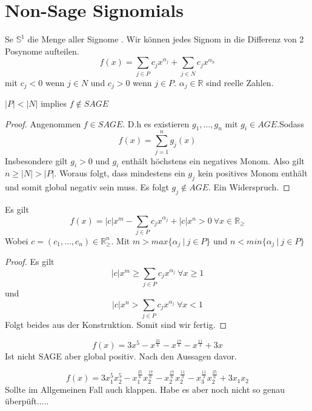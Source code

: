 \documentclass[./main.tex]{subfiles}
\begin{document}
\section{Non-Sage Signomials}
Se $\mathbb{S}^1$ die Menge aller Signome . Wir können jedes Signom in die Differenz von 2 Posynome aufteilen.
\begin{equation}
f(x)= \sum_{j \in P } c_j x^{\alpha_j} + \sum_{j \in N} c_j x^{\alpha_h}
\end{equation}
mit $c_j<0$ wenn $j \in N$ und $c_j>0$ wenn $j \in P$. $\alpha_j \in \mathbb{R}$ sind reelle Zahlen.

\begin{lem}
$\left\vert P \right\vert < \left\vert N \right\vert$ implies $f \not\in SAGE$
\begin{proof}
Angenommen $f \in SAGE$. D.h es existieren $g_1,\dots,g_n$ mit $g_i \in AGE$.Sodass 
\begin{equation}
f(x)= \sum_{j =1}^n g_j(x)
\end{equation}
Insbesondere gilt $g_i>0$ und $g_i$ enthält höchstens ein negatives Monom. Also gilt $n \geq \left\vert N \right\vert > \left\vert P \right\vert$. Woraus folgt, dass mindestens ein $g_j$ kein positives Monom enthält und somit global negativ sein muss. Es folgt $g_j \not\in  AGE$. Ein Widerspruch.
\end{proof}
\end{lem}

\begin{lem}
Es gilt
\begin{equation}
f(x) = \left\vert c \right\vert x^m - \sum_{j\in P} c_j x^{\alpha_j} + \left\vert c \right\vert x^n >0 \ \forall x\in \mathbb{R_\geq}
\end{equation}
Wobei $ c=(c_1,\dots,c_n) \in \mathbb{R}_\geq^n$. Mit $m > max \lbrace \alpha_j \ \vert \  j \in P \rbrace$ und $n < min \lbrace \alpha_j \ \vert \  j \in P \rbrace$
\begin{proof}
Es gilt
\begin{equation}
\left\vert c \right\vert x^m \geq \sum_{j\in P} c_j x^{\alpha_j} \ \forall x \geq 1
\end{equation}
und 
\begin{equation}
\left\vert c \right\vert x^n > \sum_{j\in P} c_j x^{\alpha_j} \ \forall x < 1
\end{equation}
Folgt beides aus der Konstruktion. Somit sind wir fertig.
\end{proof}
\end{lem}
\begin{bsp}[$n=1$]
\begin{equation}
f(x) = 3 x^5 -x^\frac{25} 6  - x^\frac {17} 6 - x^\frac {11} 3   + 3x
\end{equation}
Ist nicht SAGE aber global positiv. Nach den Aussagen davor.
\end{bsp}
\begin{bsp}[$n=2$]
\begin{equation} 
f(x) = 3 x_1^5x_2^5 -x_1^\frac{25} 6 x_2^\frac {17} 6  - x_2^\frac {17} 6 x_2^\frac {11} 3 - x_3^\frac {11} 3 x_2^\frac{25} 6   + 3x_1x_2
\end{equation}
\color{red} Sollte im Allgemeinen Fall auch klappen. Habe es aber noch nicht so genau überpüft.....
\end{bsp}
\end{document}
